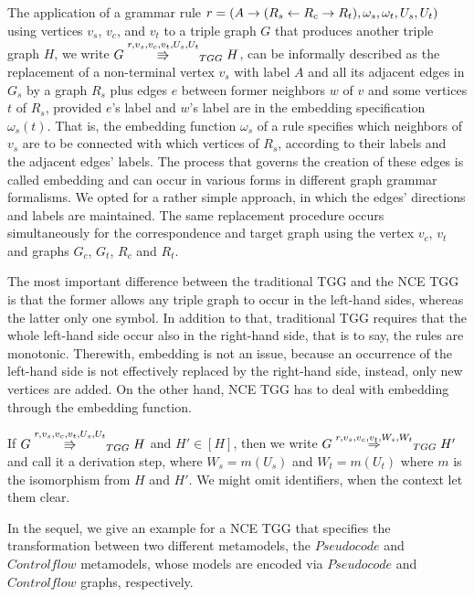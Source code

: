 \documentclass[a4paper,twoside]{article}
\begin{document}
The application of a grammar rule $r = (A \to (R_s \overset{}{\leftarrow} R_c \overset{}{\rightarrow} R_t), \omega_s, \omega_t, U_s, U_t)$ using vertices $v_s$, $v_c$, and $v_t$ to a triple graph $G$ that produces another triple graph $H$, we write $G \overset{r,v_s,v_c,v_t,U_s,U_t}{\Rrightarrow}_{TGG} H$, can be informally described as the replacement of a non-terminal vertex $v_s$ with label $A$ and all its adjacent edges in $G_s$ by a graph $R_s$ plus edges $e$ between former neighbors $w$ of $v$ and some vertices $t$ of $R_s$, provided $e$'s label and $w$'s label are in the embedding specification $\omega_s(t)$. That is, the embedding function $\omega_s$ of a rule specifies which neighbors of $v_s$ are to be connected with which vertices of $R_s$, according to their labels and the adjacent edges' labels. The process that governs the creation of these edges is called embedding and can occur in various forms in different graph grammar formalisms. We opted for a rather simple approach, in which the edges' directions and labels are maintained. The same replacement procedure occurs simultaneously for the correspondence and target graph using the vertex $v_c$, $v_t$ and graphs $G_c$, $G_t$, $R_c$ and $R_t$.

The most important difference between the traditional TGG and the NCE TGG is that the former allows any triple graph to occur in the left-hand sides, whereas the latter only one symbol. In addition to that, traditional TGG requires that the whole left-hand side occur also in the right-hand side, that is to say, the rules are monotonic. Therewith, embedding is not an issue, because an occurrence of the left-hand side is not effectively replaced by the right-hand side, instead, only new vertices are added. On the other hand, NCE TGG has to deal with embedding through the embedding function.

If $G \overset{r,v_s,v_c,v_t,U_s,U_t}{\Rrightarrow}_{TGG} H$ and $H' \in [H]$, then we write $G \overset{r,v_s,v_c,v_t,W_s,W_t}{\Rightarrow}_{TGG} H'$ and call it a derivation step, where $W_s = m(U_s)$ and $W_t = m(U_t)$ where $m$ is the isomorphism from $H$ and $H'$. We might omit identifiers, when the context let them clear.

In the sequel, we give an example for a NCE TGG that specifies the transformation between two different metamodels, the $Pseudocode$ and $Controlflow$ metamodels, whose models are encoded via $Pseudocode$ and $Controlflow$ graphs, respectively.
\end{document}
